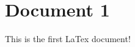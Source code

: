\documentclass{article}
\begin{document}
\section*{Document 1}
This is the first LaTex document! 
\end{document}
